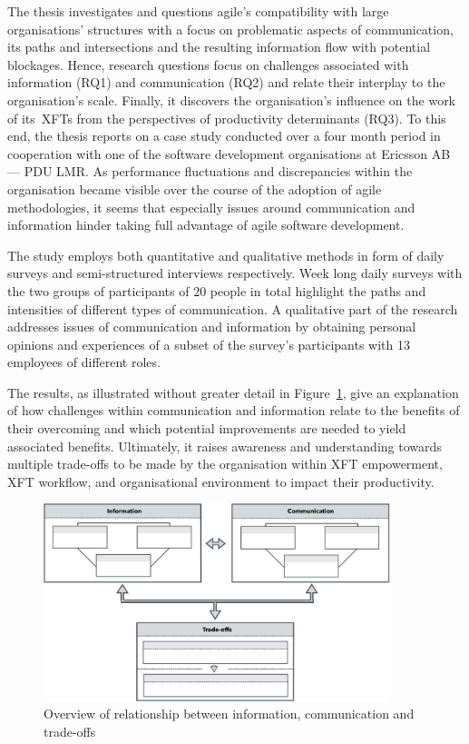 The thesis investigates and questions agile's compatibility with large organisations' structures with a focus on problematic aspects of communication, its paths and intersections and the resulting information flow with potential blockages. Hence, research questions focus on challenges associated with information (RQ1) and communication (RQ2) and relate their interplay to the organisation's scale. Finally, it discovers the organisation's influence on the work of its~\acp{XFT} from the perspectives of productivity determinants (RQ3). To this end, the thesis reports on a case study conducted over a four month period in cooperation with one of the software development organisations at Ericsson AB --- \ac{PDU LMR}. As performance fluctuations and discrepancies within the organisation became visible over the course of the adoption of agile methodologies, it seems that especially issues around communication and information hinder taking full advantage of agile software development.

The study employs both quantitative and qualitative methods in form of daily surveys and semi-structured interviews respectively. Week long daily surveys with the two groups of participants of 20 people in total highlight the paths and intensities of different types of communication. A qualitative part of the research addresses issues of communication and information by obtaining personal opinions and experiences of a subset of the survey's participants with 13 employees of different roles.

The results, as illustrated without greater detail in Figure~\ref{fig:intro-theming}, give an explanation of how challenges within communication and information relate to the benefits of their overcoming and which potential improvements are needed to yield associated benefits. Ultimately, it raises awareness and understanding towards multiple trade-offs to be made by the organisation within \ac{XFT} empowerment, XFT workflow, and organisational environment to impact their productivity.

\begin{figure}[h!]
  \centering
  \includegraphics[width=0.90\textwidth]{figures/intro-theming-diagram.png}
  \caption{Overview of relationship between information, communication and trade-offs}
  \label{fig:intro-theming}
\end{figure}

